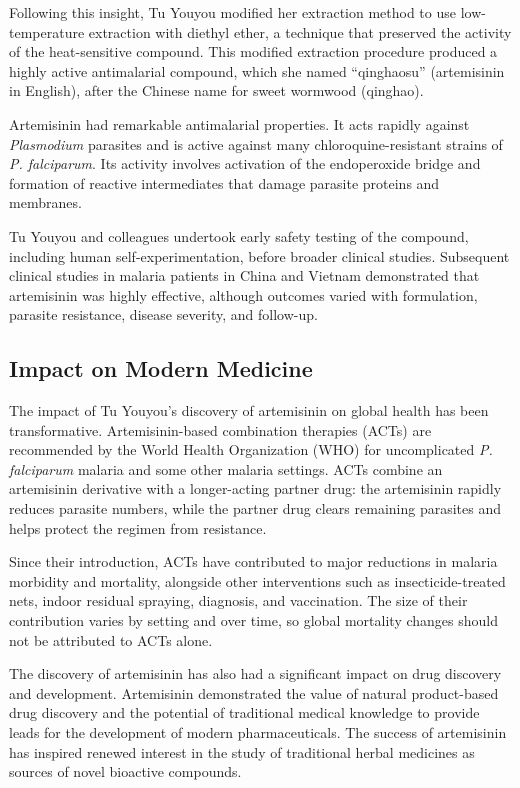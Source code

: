 Following this insight, Tu Youyou modified her extraction method to use low-temperature extraction with diethyl ether, a technique that preserved the activity of the heat-sensitive compound. This modified extraction procedure produced a highly active antimalarial compound, which she named ``qinghaosu'' (artemisinin in English), after the Chinese name for sweet wormwood (qinghao).

Artemisinin had remarkable antimalarial properties. It acts rapidly against \textit{Plasmodium} parasites and is active against many chloroquine-resistant strains of \textit{P. falciparum}. Its activity involves activation of the endoperoxide bridge and formation of reactive intermediates that damage parasite proteins and membranes.

Tu Youyou and colleagues undertook early safety testing of the compound, including human self-experimentation, before broader clinical studies. Subsequent clinical studies in malaria patients in China and Vietnam demonstrated that artemisinin was highly effective, although outcomes varied with formulation, parasite resistance, disease severity, and follow-up.

\subsection{Impact on Modern Medicine}

The impact of Tu Youyou's discovery of artemisinin on global health has been transformative. Artemisinin-based combination therapies (ACTs) are recommended by the World Health Organization (WHO) for uncomplicated \textit{P. falciparum} malaria and some other malaria settings. ACTs combine an artemisinin derivative with a longer-acting partner drug: the artemisinin rapidly reduces parasite numbers, while the partner drug clears remaining parasites and helps protect the regimen from resistance.

Since their introduction, ACTs have contributed to major reductions in malaria morbidity and mortality, alongside other interventions such as insecticide-treated nets, indoor residual spraying, diagnosis, and vaccination. The size of their contribution varies by setting and over time, so global mortality changes should not be attributed to ACTs alone.

The discovery of artemisinin has also had a significant impact on drug discovery and development. Artemisinin demonstrated the value of natural product-based drug discovery and the potential of traditional medical knowledge to provide leads for the development of modern pharmaceuticals. The success of artemisinin has inspired renewed interest in the study of traditional herbal medicines as sources of novel bioactive compounds.

